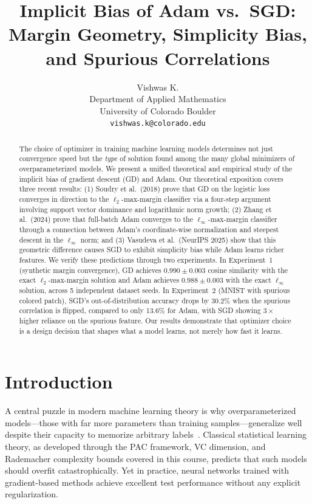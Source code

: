 \documentclass{article}
\title{Implicit Bias of Adam vs.\ SGD:\\Margin Geometry, Simplicity Bias, and Spurious Correlations}
\author{
  Vishwas K.\\
  Department of Applied Mathematics\\
  University of Colorado Boulder\\
  \texttt{vishwas.k@colorado.edu}
}
\begin{document}
\maketitle

\begin{abstract}
The choice of optimizer in training machine learning models determines not just convergence speed but the \emph{type} of solution found among the many global minimizers of overparameterized models. We present a unified theoretical and empirical study of the implicit bias of gradient descent (GD) and Adam. Our theoretical exposition covers three recent results: (1) Soudry et al.\ (2018) prove that GD on the logistic loss converges in direction to the $\ell_2$-max-margin classifier via a four-step argument involving support vector dominance and logarithmic norm growth; (2) Zhang et al.\ (2024) prove that full-batch Adam converges to the $\ell_\infty$-max-margin classifier through a connection between Adam's coordinate-wise normalization and steepest descent in the $\ell_\infty$ norm; and (3) Vasudeva et al.\ (NeurIPS 2025) show that this geometric difference causes SGD to exhibit simplicity bias while Adam learns richer features. We verify these predictions through two experiments. In Experiment~1 (synthetic margin convergence), GD achieves $0.990 \pm 0.003$ cosine similarity with the exact $\ell_2$-max-margin solution and Adam achieves $0.988 \pm 0.003$ with the exact $\ell_\infty$ solution, across 5 independent dataset seeds. In Experiment~2 (MNIST with spurious colored patch), SGD's out-of-distribution accuracy drops by 30.2\% when the spurious correlation is flipped, compared to only 13.6\% for Adam, with SGD showing $3\times$ higher reliance on the spurious feature. Our results demonstrate that optimizer choice is a design decision that shapes what a model learns, not merely how fast it learns.
\end{abstract}

\section{Introduction}
\label{sec:intro}

A central puzzle in modern machine learning theory is why overparameterized models---those with far more parameters than training samples---generalize well despite their capacity to memorize arbitrary labels~\cite{zhang2017understanding}. Classical statistical learning theory, as developed through the PAC framework, VC dimension, and Rademacher complexity bounds covered in this course, predicts that such models should overfit catastrophically. Yet in practice, neural networks trained with gradient-based methods achieve excellent test performance without any explicit regularization.
\end{document}
